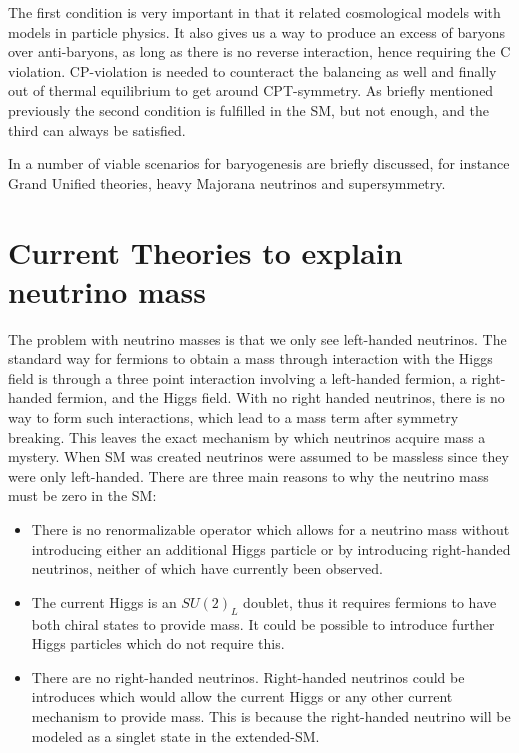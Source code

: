 The first condition is very important in that it related cosmological models with models in particle physics. It also gives us a way to produce an excess of baryons over anti-baryons, as long as there is no reverse interaction, hence requiring the C violation. CP-violation is needed to counteract the balancing as well and finally out of thermal equilibrium to get around CPT-symmetry. As briefly mentioned previously the second condition is fulfilled in the SM, but not enough, and the third can always be satisfied.

In \cite{36CRC} a number of viable scenarios for baryogenesis are briefly discussed, for instance Grand Unified theories, heavy Majorana neutrinos and supersymmetry.

\section{Current Theories to explain neutrino mass}
The problem with neutrino masses is that we only see left-handed neutrinos. The standard way for fermions to obtain a mass through interaction with the Higgs field is through a three point interaction involving a left-handed fermion, a right-handed fermion, and the Higgs field. With no right handed neutrinos, there is no way to form such interactions, which lead to a mass term after symmetry breaking. This leaves the exact mechanism by which neutrinos acquire mass a mystery. When SM was created neutrinos were assumed to be massless since they were only left-handed. There are three main reasons to why the neutrino mass must be zero in the SM:
\begin{itemize}
\item There is no renormalizable operator which allows for a neutrino mass without introducing either an additional Higgs particle or by introducing right-handed neutrinos, neither of which have currently been observed.

\item The current Higgs is an $SU(2)_L$ doublet, thus it requires fermions to have both chiral states to provide mass. It could be possible to introduce further Higgs particles which do not require this.

\item There are no right-handed neutrinos. Right-handed neutrinos could be introduces which would allow the current Higgs or any other current mechanism to provide mass. This is because the right-handed neutrino will be modeled as a singlet state in the extended-SM.
\end{itemize}

